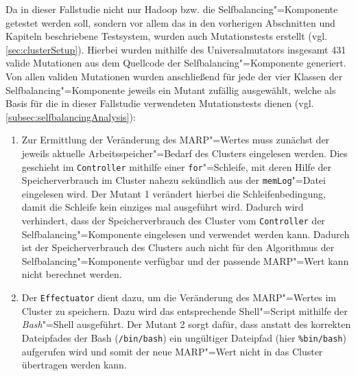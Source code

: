 Da in dieser Fallstudie nicht nur Hadoop bzw. die Selfbalancing"=Komponente getestet werden soll, sondern vor allem das in den vorherigen Abschnitten und Kapiteln beschriebene Testsystem, wurden auch \glspl{Mutationstest} erstellt (vgl. \cref{sec:clusterSetup}).
Hierbei wurden mithilfe des Universalmutators insgesamt 431 valide Mutationen aus dem Quellcode der Selfbalancing"=Komponente generiert.
Von allen validen Mutationen wurden anschließend für jede der vier Klassen der Selfbalancing"=Komponente jeweils ein Mutant zufällig ausgewählt, welche als Basis für die in dieser Fallstudie verwendeten \glspl{Mutationstest} dienen (vgl. \cref{subsec:selfbalancingAnalysis}):

\begin{enumerate}
    \item
    Zur Ermittlung der Veränderung des \gls{MARP}"=Wertes muss zunächst der jeweils aktuelle Arbeitsspeicher"=Bedarf des Clusters eingelesen werden.
    Dies geschieht im \texttt{Controller} mithilfe einer \texttt{for}"=Schleife, mit deren Hilfe der Speicherverbrauch im Cluster nahezu sekündlich aus der \texttt{memLog}"=Datei eingelesen wird.
    Der Mutant 1 verändert hierbei die Schleifenbedingung, damit die Schleife kein einziges mal ausgeführt wird.
    Dadurch wird verhindert, dass der Speicherverbrauch des Cluster vom \texttt{Controller} der Selfbalancing"=Komponente eingelesen und verwendet werden kann.
    Dadurch ist der Speicherverbrauch des Clusters auch nicht für den Algorithmus \cite{Zhang2016} der Selfbalancing"=Komponente verfügbar und der passende \gls{MARP}"=Wert kann nicht berechnet werden.
    
    \item 
    Der \texttt{Effectuator} dient dazu, um die Veränderung des \gls{MARP}"=Wertes im Cluster zu speichern.
    Dazu wird das entsprechende Shell"=Script mithilfe der \emph{Bash}"=Shell ausgeführt.
    Der Mutant 2 sorgt dafür, dass anstatt des korrekten Dateipfades der Bash (\texttt{/bin/bash}) ein ungültiger Dateipfad (hier \texttt{\%bin/bash}) aufgerufen wird und somit der neue \gls{MARP}"=Wert nicht in das Cluster übertragen werden kann.
    

\end{enumerate}

